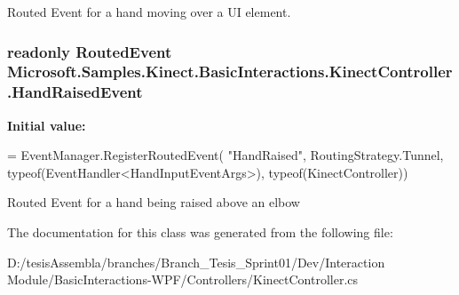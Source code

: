 Routed Event for a hand moving over a U\-I element. 

\hypertarget{class_microsoft_1_1_samples_1_1_kinect_1_1_basic_interactions_1_1_kinect_controller_afc084e0ca10a5076a66eb75a3a619b48}{
\subsubsection[{Hand\-Raised\-Event}]{\setlength{\rightskip}{0pt plus 5cm}readonly Routed\-Event Microsoft.\-Samples.\-Kinect.\-Basic\-Interactions.\-Kinect\-Controller.\-Hand\-Raised\-Event\hspace{0.3cm}{\ttfamily [static]}}}\label{class_microsoft_1_1_samples_1_1_kinect_1_1_basic_interactions_1_1_kinect_controller_afc084e0ca10a5076a66eb75a3a619b48}
{\bfseries Initial value\-:}
\begin{DoxyCode}
= EventManager.RegisterRoutedEvent(
            \textcolor{stringliteral}{"HandRaised"},
            RoutingStrategy.Tunnel,
            typeof(EventHandler<HandInputEventArgs>),
            typeof(KinectController))
\end{DoxyCode}


Routed Event for a hand being raised above an elbow 



The documentation for this class was generated from the following file\-:\begin{DoxyCompactItemize}
\item 
D\-:/tesis\-Assembla/branches/\-Branch\-\_\-\-Tesis\-\_\-\-Sprint01/\-Dev/\-Interaction Module/\-Basic\-Interactions-\/\-W\-P\-F/\-Controllers/Kinect\-Controller.\-cs\end{DoxyCompactItemize}
